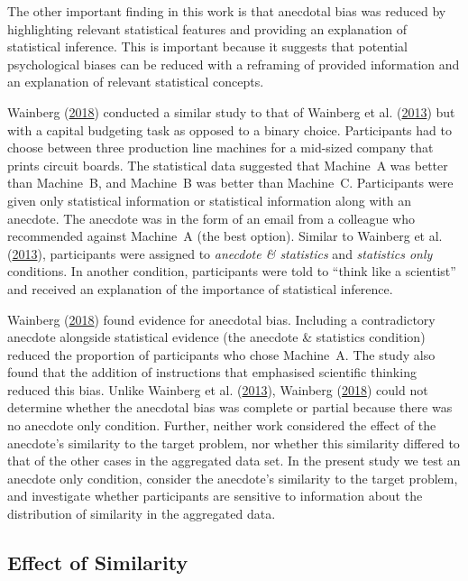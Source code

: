 \documentclass[
  man, donotrepeattitle,floatsintext]{apa7}
\theoremstyle{definition}
\theoremstyle{definition}
\theoremstyle{definition}
\theoremstyle{definition}
\theoremstyle{remark}
\begin{document}
The other important finding in this work is that anecdotal bias was reduced by
highlighting relevant statistical features and providing an explanation of
statistical inference. This is important because it suggests that potential
psychological biases can be reduced with a reframing of provided information and
an explanation of relevant statistical concepts.

Wainberg (\protect\hyperlink{ref-wainberg2018}{2018}) conducted a similar study to that of Wainberg et al. (\protect\hyperlink{ref-wainberg2013}{2013}) but with a
capital budgeting task as opposed to a binary choice. Participants had to choose
between three production line machines for a mid-sized company that prints
circuit boards. The statistical data suggested that Machine~A was better than
Machine~B, and Machine~B was better than Machine~C. Participants were given only
statistical information or statistical information along with an anecdote. The
anecdote was in the form of an email from a colleague who recommended against
Machine~A (the best option). Similar to Wainberg et al. (\protect\hyperlink{ref-wainberg2013}{2013}), participants were
assigned to \emph{anecdote \& statistics} and \emph{statistics only} conditions. In another
condition, participants were told to ``think like a scientist'' and received an
explanation of the importance of statistical inference.

Wainberg (\protect\hyperlink{ref-wainberg2018}{2018}) found evidence for anecdotal bias. Including a contradictory
anecdote alongside statistical evidence (the anecdote \& statistics condition)
reduced the proportion of participants who chose Machine~A. The study also found
that the addition of instructions that emphasised scientific thinking reduced
this bias. Unlike Wainberg et al. (\protect\hyperlink{ref-wainberg2013}{2013}), Wainberg (\protect\hyperlink{ref-wainberg2018}{2018}) could not determine whether the
anecdotal bias was complete or partial because there was no anecdote only
condition. Further, neither work considered the effect of the anecdote's
similarity to the target problem, nor whether this similarity differed to that
of the other cases in the aggregated data set. In the present study we test an
anecdote only condition, consider the anecdote's similarity to the target
problem, and investigate whether participants are sensitive to information about
the distribution of similarity in the aggregated data.

\hypertarget{effect-of-similarity}{%
\subsection{Effect of Similarity}\label{effect-of-similarity}}
\end{document}
